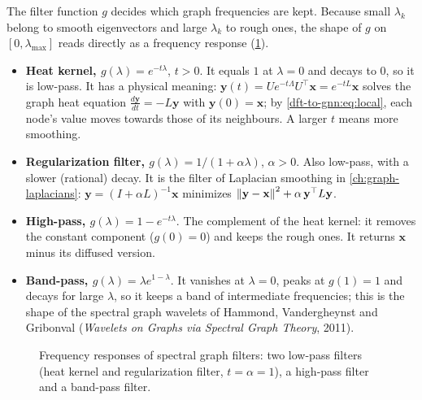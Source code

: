 \begin{notechapter}
The filter function $g$ decides which graph frequencies are kept. Because small $\lambda_k$ belong to smooth eigenvectors and large $\lambda_k$ to rough ones, the shape of $g$ on $[0, \lambda_{\max}]$ reads directly as a frequency response (\cref{dft-to-gnn:fig:filters}).
\begin{itemize}
\item \textbf{Heat kernel, $g(\lambda) = e^{-t\lambda}$}, $t > 0$. It equals $1$ at $\lambda = 0$ and decays to $0$, so it is low-pass. It has a physical meaning: $\mathbf{y}(t) = U e^{-t\Lambda}U^\top\mathbf{x} = e^{-tL}\mathbf{x}$ solves the graph heat equation $\frac{d\mathbf{y}}{dt} = -L\mathbf{y}$ with $\mathbf{y}(0) = \mathbf{x}$; by \eqref{dft-to-gnn:eq:local}, each node's value moves towards those of its neighbours. A larger $t$ means more smoothing.
\item \textbf{Regularization filter, $g(\lambda) = 1/(1 + \alpha\lambda)$}, $\alpha > 0$. Also low-pass, with a slower (rational) decay. It is the filter of Laplacian smoothing in \cref{ch:graph-laplacians}: $\mathbf{y} = (I + \alpha L)^{-1}\mathbf{x}$ minimizes $\left\|\mathbf{y} - \mathbf{x}\right\|^2 + \alpha\,\mathbf{y}^\top L\mathbf{y}$.
\item \textbf{High-pass, $g(\lambda) = 1 - e^{-t\lambda}$}. The complement of the heat kernel: it removes the constant component ($g(0) = 0$) and keeps the rough ones. It returns $\mathbf{x}$ minus its diffused version.
\item \textbf{Band-pass, $g(\lambda) = \lambda e^{1-\lambda}$}. It vanishes at $\lambda = 0$, peaks at $g(1) = 1$ and decays for large $\lambda$, so it keeps a band of intermediate frequencies; this is the shape of the spectral graph wavelets of Hammond, Vandergheynst and Gribonval (\emph{Wavelets on Graphs via Spectral Graph Theory}, 2011).
\end{itemize}

\begin{figure}[H]
\centering
{}
\caption{Frequency responses of spectral graph filters: two low-pass filters (heat kernel and regularization filter, $t=\alpha=1$), a high-pass filter and a band-pass filter.}
\label{dft-to-gnn:fig:filters}
\end{figure}


\end{notechapter}
